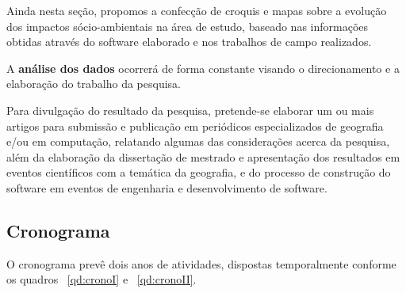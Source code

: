 Ainda nesta seção, propomos a confecção de croquis e mapas sobre a evolução dos impactos sócio-ambientais na área de estudo, baseado nas informações obtidas através do software elaborado e nos trabalhos de campo realizados.

A \textbf{análise dos dados} ocorrerá de forma constante visando o direcionamento e a elaboração do trabalho da pesquisa. 

Para divulgação do resultado da pesquisa, pretende-se elaborar um ou mais artigos para submissão e publicação em periódicos especializados de geografia e/ou em computação, relatando algumas das considerações acerca da pesquisa, além da elaboração da dissertação de mestrado e apresentação dos resultados em eventos científicos com a temática da geografia, e do processo de construção do software em eventos de engenharia e desenvolvimento de software.

\subsection{Cronograma}

O cronograma prevê dois anos de atividades, dispostas temporalmente conforme os quadros ~\ref{qd:cronoI} e ~\ref{qd:cronoII}.



